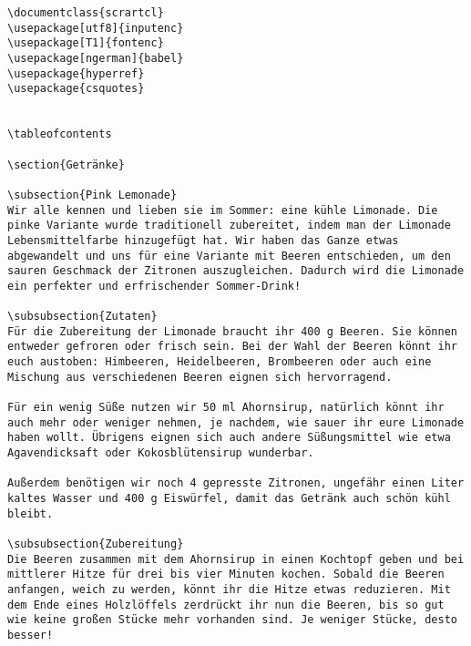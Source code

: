 \begin{verbatim}
\documentclass{scrartcl}
\usepackage[utf8]{inputenc}
\usepackage[T1]{fontenc}
\usepackage[ngerman]{babel}
\usepackage{hyperref}
\usepackage{csquotes}
	

\tableofcontents
	
\section{Getränke}
	
\subsection{Pink Lemonade}
Wir alle kennen und lieben sie im Sommer: eine kühle Limonade. Die pinke Variante wurde traditionell zubereitet, indem man der Limonade Lebensmittelfarbe hinzugefügt hat. Wir haben das Ganze etwas abgewandelt und uns für eine Variante mit Beeren entschieden, um den sauren Geschmack der Zitronen auszugleichen. Dadurch wird die Limonade ein perfekter und erfrischender Sommer-Drink!
	
\subsubsection{Zutaten}
Für die Zubereitung der Limonade braucht ihr 400 g Beeren. Sie können entweder gefroren oder frisch sein. Bei der Wahl der Beeren könnt ihr euch austoben: Himbeeren, Heidelbeeren, Brombeeren oder auch eine Mischung aus verschiedenen Beeren eignen sich hervorragend. 
	
Für ein wenig Süße nutzen wir 50 ml Ahornsirup, natürlich könnt ihr auch mehr oder weniger nehmen, je nachdem, wie sauer ihr eure Limonade haben wollt. Übrigens eignen sich auch andere Süßungsmittel wie etwa Agavendicksaft oder Kokosblütensirup wunderbar.
	
Außerdem benötigen wir noch 4 gepresste Zitronen, ungefähr einen Liter kaltes Wasser und 400 g Eiswürfel, damit das Getränk auch schön kühl bleibt.
	
\subsubsection{Zubereitung}
Die Beeren zusammen mit dem Ahornsirup in einen Kochtopf geben und bei mittlerer Hitze für drei bis vier Minuten kochen. Sobald die Beeren anfangen, weich zu werden, könnt ihr die Hitze etwas reduzieren. Mit dem Ende eines Holzlöffels zerdrückt ihr nun die Beeren, bis so gut wie keine großen Stücke mehr vorhanden sind. Je weniger Stücke, desto besser!
	

\end{verbatim}
